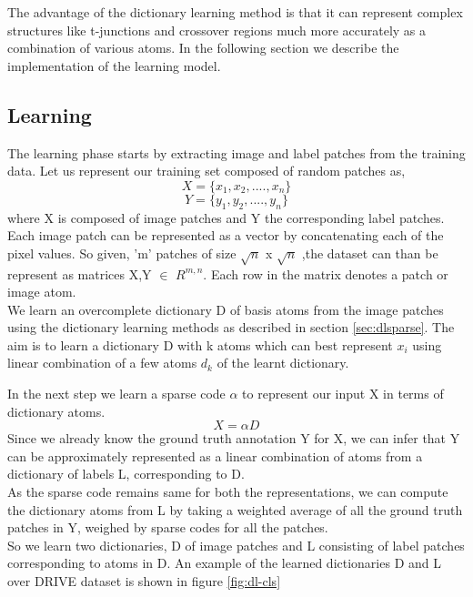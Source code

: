 The advantage of the dictionary learning method is that it can represent complex structures like t-junctions and crossover regions much more accurately as a combination of various atoms. In the following section we describe the implementation of the learning model.

\subsection{Learning}
The learning phase starts by extracting image and label patches from the training data. Let us represent our training set composed of random patches as,
$$
X = \{x_1,x_2,....,x_n\}
$$
$$
Y = \{y_1,y_2,....,y_n\}
$$
where X is composed of image patches and Y the corresponding label patches. Each image patch can be represented as a vector by concatenating each of the pixel values. So given, 'm' patches of size $\sqrt{n}$ x $\sqrt{n}$ ,the dataset can than be represent as matrices 
X,Y $\in$ $R^{m,n}$. Each row in the matrix denotes a patch or image atom.\\

We learn an overcomplete dictionary D of basis atoms from the image patches using the dictionary learning methods as described in section \ref{sec:dlsparse}. The aim is to learn a dictionary D with k atoms which can best represent $x_i$ using linear combination of a few atoms $d_k$ of the learnt dictionary.

In the next step we learn a sparse code $\alpha$ to represent our input X in terms of dictionary atoms.
$$
X = \alpha D
$$ 
Since we already know the ground truth annotation Y for X, we can infer that Y can be approximately represented as a linear combination of atoms from a dictionary of labels L, corresponding to D.\\

As the sparse code remains same for both the representations, we can compute the dictionary atoms from L by taking a weighted average of all the ground truth patches in Y, weighed by sparse codes for all the patches.\\

So we learn two dictionaries, D of image patches and L consisting of label patches corresponding to atoms in D. An example of the learned dictionaries D and L over DRIVE dataset is shown in figure \ref{fig:dl-cls}

